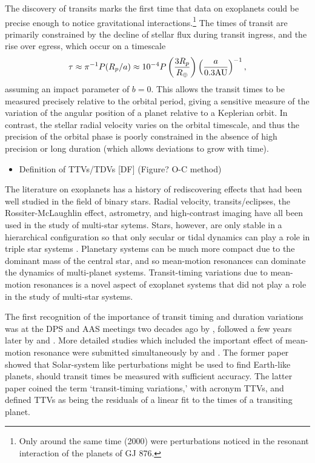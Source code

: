 \documentclass[graybox,natbib,nosecnum]{svmult}
\begin{document}
The discovery of transits marks the first time that data on exoplanets could be precise enough to notice gravitational interactions.\footnote{Only around the same time (2000) were perturbations noticed in the resonant interaction of the planets of GJ 876.}  The times of transit are primarily constrained by the decline of stellar flux during transit ingress, and the rise over egress, which occur on a timescale 
\begin{equation} \label{ingress}
\tau \approx \pi^{-1} P(R_p/a) \approx 10^{-4}P \left(\frac{3 R_p}{R_\oplus}\right) \left(\frac{a}{0.3 \rm{AU}}\right)^{-1},
\end{equation}  
assuming an impact parameter of $b=0$.
This allows the transit times to be measured precisely relative to the orbital period, giving a sensitive measure of the variation of the angular position of a planet relative to a Keplerian orbit.  In contrast, the stellar radial velocity varies on the orbital timescale, and thus the precision of the orbital phase is poorly constrained in the absence of high precision or long duration (which allows deviations to grow with time).

\begin{itemize}
\item Definition of TTVs/TDVs [DF] (Figure? O-C method)
     \citep{2005Sci...307.1288H,2010Sci...330...51H}
\end{itemize}

The literature on exoplanets has a history of rediscovering effects that had been well studied in the field of binary stars.  Radial velocity, transits/eclipses, the Rossiter-McLaughlin effect, astrometry, and high-contrast imaging have all been used in the study of multi-star sytems.  Stars, however, are only stable in a hierarchical configuration so that only secular or tidal dynamics can play a role in triple star systems \citep{2003A&A...398.1091B}.  Planetary systems can be much more compact due to the dominant mass of the central star, and so mean-motion resonances can dominate the dynamics of multi-planet systems.  Transit-timing variations due to mean-motion resonances is a novel aspect of exoplanet systems that did not play a role in the study of multi-star systems.  

The first recognition of the importance of transit timing and duration variations was at the DPS and AAS meetings two decades ago by \citet{1996DPS....28.1208D,1996BAAS...28.1112D}, followed a few years later by \citet{2002ApJ...564.1019M} and \citet{Schneider2003,Schneider2004}.  More detailed studies which included the important effect of mean-motion resonance were submitted simultaneously by \citet{2005Sci...307.1288H} and \citet{2005MNRAS.359..567A}.  The former paper showed that Solar-system like perturbations might be used to find Earth-like planets, should transit times be measured with sufficient accuracy.  The latter paper coined the term `transit-timing variations,' with acronym TTVs, and defined TTVs as being the residuals of a linear fit to the times of a transiting planet.
\end{document}
